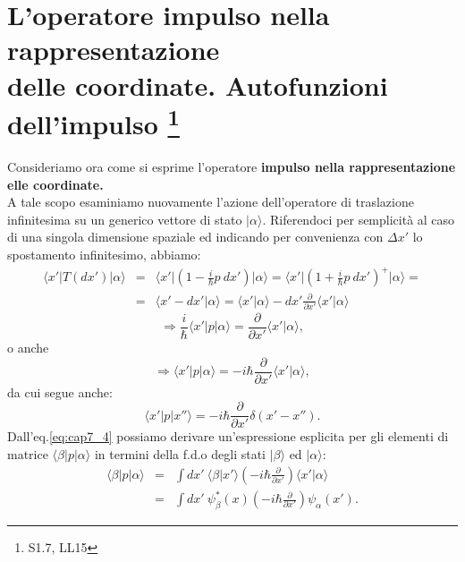 \section[L'operatore impulso nella rappresentazione delle coordinate. Autofunzioni dell'impulso]{L'operatore impulso nella rappresentazione \\delle coordinate. Autofunzioni dell'impulso \footnote{S1.7, LL15}}
Consideriamo ora come si esprime l'operatore \textbf{impulso nella rappresentazione elle coordinate.}\\
A tale scopo esaminiamo nuovamente l'azione dell'operatore di traslazione infinitesima su un generico vettore di stato $\vert \alpha \rangle$. Riferendoci per semplicità al caso di una singola dimensione spaziale ed indicando per convenienza con $\Delta x'$ lo spostamento infinitesimo, abbiamo:
\begin{eqnarray}
\langle x' \vert T(dx') \vert \alpha \rangle 
& = & \langle x' \vert \left(1-\frac{i}{\hbar}p\ dx'\right) \vert \alpha \rangle = \langle x' \vert \left(1+\frac{i}{\hbar}p\ dx'\right) ^+ \vert \alpha \rangle = \nonumber \\
& = & \langle x'-dx'\vert \alpha \rangle = \langle x'\vert \alpha \rangle  - dx' \frac{\partial}{\partial x'} \langle x'\vert \alpha \rangle 
\end{eqnarray}
\begin{equation}
 \Rightarrow \frac{i}{\hbar}\langle x'\vert p \vert \alpha \rangle = \frac{\partial}{\partial x'}\langle x'\vert \alpha \rangle ,
\end{equation}
o anche
\begin{equation}
\label{eq:cap7_4}
\Rightarrow \langle x'\vert p \vert \alpha \rangle =-i\hbar\frac{\partial}{\partial x'}\langle x'\vert \alpha \rangle ,
\end{equation}
da cui segue anche:
\begin{equation}
\langle x'\vert p \vert x'' \rangle =-i\hbar\frac{\partial}{\partial x'}\delta (x'-x'').
\end{equation}
Dall'eq.\eqref{eq:cap7_4} possiamo derivare un'espressione esplicita per gli elementi di matrice $\langle \beta \vert p\vert \alpha \rangle $ in termini della f.d.o degli stati $\vert \beta \rangle $ ed $\vert \alpha \rangle $:
\begin{eqnarray}
\label{eq:cap7_5}
\langle \beta \vert p \vert \alpha \rangle &=& \int dx' \ \langle \beta \vert x' \rangle \left( -i\hbar \frac{\partial}{\partial x'}\right) \langle x' \vert \alpha \rangle  \nonumber \\
& = &\int dx' \ \psi _{\beta} ^* (x) \left( -i\hbar \frac{\partial}{\partial x'}\right) \psi _{\alpha}  (x') .  
\end{eqnarray}
